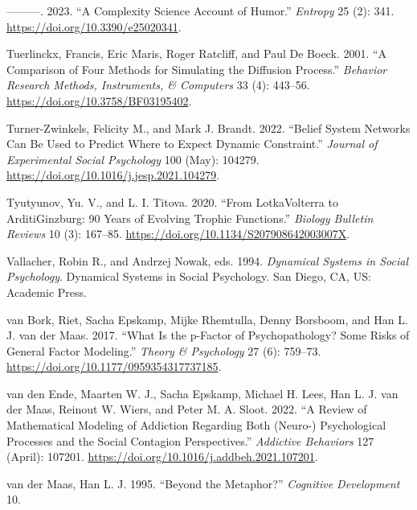\documentclass[
  a4paper,
  DIV=11,
  numbers=noendperiod,
  oneside]{scrreprt}
\newlength{\cslhangindent}
\newenvironment{CSLReferences}[2] %
 {\begin{list}{}{%
  \setlength{\itemindent}{0pt}
  \setlength{\leftmargin}{0pt}
  \setlength{\parsep}{0pt}
  \ifodd #1
   \setlength{\leftmargin}{\cslhangindent}
   \setlength{\itemindent}{-1\cslhangindent}
  \fi
  \setlength{\itemsep}{#2\baselineskip}}}
 {\end{list}}
\begin{document}
\begin{CSLReferences}{1}{0}
---------. 2023. {``A Complexity Science Account of Humor.''}
\emph{Entropy} 25 (2): 341. \url{https://doi.org/10.3390/e25020341}.

Tuerlinckx, Francis, Eric Maris, Roger Ratcliff, and Paul De Boeck.
2001. {``A Comparison of Four Methods for Simulating the Diffusion
Process.''} \emph{Behavior Research Methods, Instruments, \& Computers}
33 (4): 443--56. \url{https://doi.org/10.3758/BF03195402}.

Turner-Zwinkels, Felicity M., and Mark J. Brandt. 2022. {``Belief System
Networks Can Be Used to Predict Where to Expect Dynamic Constraint.''}
\emph{Journal of Experimental Social Psychology} 100 (May): 104279.
\url{https://doi.org/10.1016/j.jesp.2021.104279}.

Tyutyunov, Yu. V., and L. I. Titova. 2020. {``From
Lotka{\textendash}Volterra to Arditi{\textendash}Ginzburg: 90 Years of
Evolving Trophic Functions.''} \emph{Biology Bulletin Reviews} 10 (3):
167--85. \url{https://doi.org/10.1134/S207908642003007X}.

Vallacher, Robin R., and Andrzej Nowak, eds. 1994. \emph{Dynamical
Systems in Social Psychology}. Dynamical Systems in Social Psychology.
{San Diego, CA, US}: {Academic Press}.

van Bork, Riet, Sacha Epskamp, Mijke Rhemtulla, Denny Borsboom, and Han
L. J. van der Maas. 2017. {``What Is the p-Factor of Psychopathology?
{Some} Risks of General Factor Modeling.''} \emph{Theory \& Psychology}
27 (6): 759--73. \url{https://doi.org/10.1177/0959354317737185}.

van den Ende, Maarten W. J., Sacha Epskamp, Michael H. Lees, Han L. J.
van der Maas, Reinout W. Wiers, and Peter M. A. Sloot. 2022. {``A Review
of Mathematical Modeling of Addiction Regarding Both (Neuro-)
Psychological Processes and the Social Contagion Perspectives.''}
\emph{Addictive Behaviors} 127 (April): 107201.
\url{https://doi.org/10.1016/j.addbeh.2021.107201}.

van der Maas, Han L. J. 1995. {``Beyond the Metaphor?''} \emph{Cognitive
Development} 10.


\end{CSLReferences}
\end{document}
